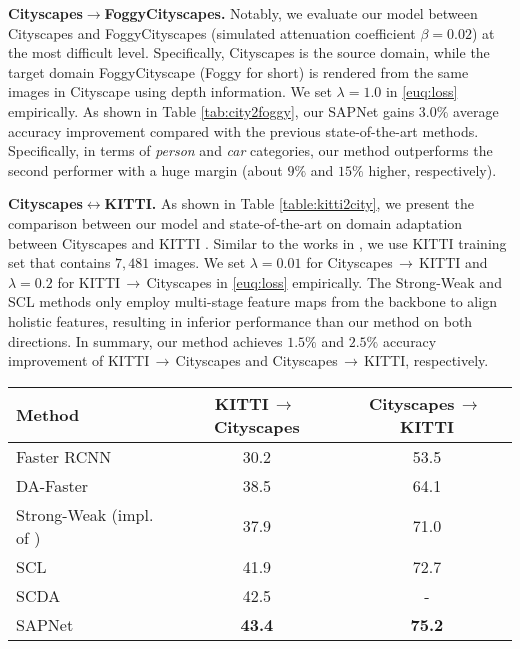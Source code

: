 \documentclass[runningheads]{llncs}
\begin{document}
{\flushleft \textbf{Cityscapes$\to$FoggyCityscapes.}} Notably, we evaluate our model between Cityscapes \cite{DBLP:conf/cvpr/CordtsORREBFRS16} and FoggyCityscapes \cite{DBLP:journals/ijcv/SakaridisDG18} (simulated attenuation coefficient $\beta=0.02$) at the most difficult level. Specifically, Cityscapes is the source domain, while the target domain FoggyCityscape (Foggy for short) is rendered from the same images in Cityscape using depth information. We set $\lambda = 1.0$ in \eqref{euq:loss} empirically. As shown in Table \ref{tab:city2foggy}, our SAPNet gains $3.0\%$ average accuracy improvement compared with the previous state-of-the-art methods. Specifically, in terms of \textit{person} and \textit{car} categories, our method outperforms the second performer with a huge margin (about $9\%$ and $15\%$ higher, respectively).

{\flushleft \textbf{Cityscapes$\leftrightarrow$KITTI.}} As shown in Table \ref{table:kitti2city}, we present the comparison between our model and state-of-the-art on domain adaptation between Cityscapes \cite{DBLP:conf/cvpr/CordtsORREBFRS16} and KITTI \cite{DBLP:conf/cvpr/GeigerLU12}. Similar to the works in \cite{DBLP:conf/cvpr/Chen0SDG18,DBLP:journals/corr/abs-1911-02559}, we use KITTI training set that contains $7,481$ images. We set $\lambda = 0.01$ for Cityscapes$\,\to\,$KITTI and $\lambda = 0.2$ for KITTI$\,\to\,$Cityscapes in \eqref{euq:loss} empirically. The Strong-Weak and SCL \cite{DBLP:journals/corr/abs-1911-02559} methods only employ multi-stage feature maps from the backbone to align holistic features, resulting in inferior performance than our method on both directions. In summary, our method achieves $1.5\%$ and $2.5\%$ accuracy improvement of KITTI$\,\to\,$Cityscapes and Cityscapes$\,\to\,$KITTI, respectively.

\begin{table*}[t]
\centering
\caption{Adaptation detection results between KITTI and Cityscapes. We report AP scores in terms of the car category on both directions, including KITTI$\,\to\,$Cityscapes and Cityscapes$\,\to\,$KITTI.}
\setlength{\tabcolsep}{9.5pt}
\begin{tabular}{l|c|c}
\hline
Method &KITTI$\,\to\,$Cityscapes &Cityscapes$\,\to\,$KITTI \\
\hline
Faster RCNN                              & 30.2    &  53.5    \\
DA-Faster \cite{DBLP:conf/cvpr/Chen0SDG18}           & 38.5    &  64.1    \\
Strong-Weak (impl. of \cite{DBLP:journals/corr/abs-1911-02559}) & 37.9   &  71.0   \\
SCL \cite{DBLP:journals/corr/abs-1911-02559}                   & 41.9    &  72.7    \\
SCDA \cite{DBLP:conf/cvpr/ZhuPYSL19}  & 42.5 & -\\
SAPNet                                     &{\bf 43.4} &{\bf 75.2} \\
\hline
\end{tabular}
\label{table:kitti2city}
\end{table*}
\end{document}

